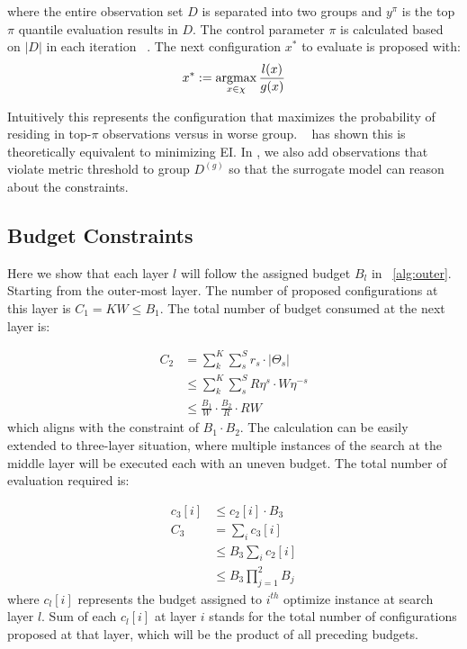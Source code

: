 where the entire observation set $D$ is separated into two groups and $y^{\pi}$ is the top $\pi$ quantile evaluation results in $D$. The control parameter $\pi$ is calculated based on $|D|$ in each iteration ~\cite{Watanabe2023TreestructuredPE}. The next configuration $x^*$ to evaluate is proposed with:
\begin{align*}
    x^* := \operatorname*{argmax}_{x \in \chi} \frac{l(x)}{g(x)}
\end{align*}

Intuitively this represents the configuration that maximizes the probability of residing in top-$\pi$ observations versus in worse group. ~\cite{bergstra2011tpe} has shown this is theoretically equivalent to minimizing EI. In \sysname, we also add observations that violate metric threshold to group $D^{(g)}$ so that the surrogate model can reason about the constraints.

\subsection{Budget Constraints}
Here we show that each layer $l$ will follow the assigned budget $B_l$ in ~\ref{alg:outer}. Starting from the outer-most layer. The number of proposed configurations at this layer is $C_1 = KW \leq B_1$. The total number of budget consumed at the next layer is:

\begin{align*}
    C_2 &= \sum_{k}^K \sum_{s}^S r_s\cdot|\Theta_s|\\
    &\leq\sum_{k}^K\sum_{s}^S R\eta^s \cdot W\eta^{-s} \\
    &\leq \frac{B_1}{W} \cdot \frac{B_{2}}{R} \cdot RW
\end{align*}
which aligns with the constraint of $B_1\cdot B_{2}$. The calculation can be easily extended to three-layer situation, where multiple instances of the search at the middle layer will be executed each with an uneven budget. The total number of evaluation required is:

\begin{align*}
    c_3[i] &\leq c_{2}[i]\cdot B_3\\
    C_3 &= \sum_i c_{3}[i] \\
    &\leq B_{3} \sum_i c_2[i] \\
    &\leq B_3 \prod_{j=1}^2B_j
\end{align*}
where $c_l[i]$ represents the budget assigned to $i^{th}$ optimize instance at search layer $l$. Sum of each $c_l[i]$ at layer $i$ stands for the total number of configurations proposed at that layer, which will be the product of all preceding budgets.


